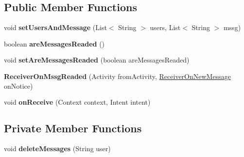 \subsection*{Public Member Functions}
\begin{DoxyCompactItemize}
\item 
void {\bfseries set\+Users\+And\+Message} (List$<$ String $>$ users, List$<$ String $>$ mssg)\hypertarget{classcom_1_1example_1_1sebastian_1_1tindertp_1_1services_1_1ReceiverOnMssgReaded_a0b295be6cc923886f566dd7314c4a232}{}\label{classcom_1_1example_1_1sebastian_1_1tindertp_1_1services_1_1ReceiverOnMssgReaded_a0b295be6cc923886f566dd7314c4a232}

\item 
boolean {\bfseries are\+Messages\+Readed} ()\hypertarget{classcom_1_1example_1_1sebastian_1_1tindertp_1_1services_1_1ReceiverOnMssgReaded_a9b267b3d5219a1ffc164fe71b8597c8e}{}\label{classcom_1_1example_1_1sebastian_1_1tindertp_1_1services_1_1ReceiverOnMssgReaded_a9b267b3d5219a1ffc164fe71b8597c8e}

\item 
void {\bfseries set\+Are\+Messages\+Readed} (boolean are\+Messages\+Readed)\hypertarget{classcom_1_1example_1_1sebastian_1_1tindertp_1_1services_1_1ReceiverOnMssgReaded_a408e241cdf6c2c7ec306cb8c66239d7a}{}\label{classcom_1_1example_1_1sebastian_1_1tindertp_1_1services_1_1ReceiverOnMssgReaded_a408e241cdf6c2c7ec306cb8c66239d7a}

\item 
{\bfseries Receiver\+On\+Mssg\+Readed} (Activity from\+Activity, \hyperlink{classcom_1_1example_1_1sebastian_1_1tindertp_1_1services_1_1ReceiverOnNewMessage}{Receiver\+On\+New\+Message} on\+Notice)\hypertarget{classcom_1_1example_1_1sebastian_1_1tindertp_1_1services_1_1ReceiverOnMssgReaded_a9edafadd0c17e71779d1cce4c87a8ceb}{}\label{classcom_1_1example_1_1sebastian_1_1tindertp_1_1services_1_1ReceiverOnMssgReaded_a9edafadd0c17e71779d1cce4c87a8ceb}

\item 
void {\bfseries on\+Receive} (Context context, Intent intent)\hypertarget{classcom_1_1example_1_1sebastian_1_1tindertp_1_1services_1_1ReceiverOnMssgReaded_a21fdef61bace4bbc1f3bd4c48f95ad98}{}\label{classcom_1_1example_1_1sebastian_1_1tindertp_1_1services_1_1ReceiverOnMssgReaded_a21fdef61bace4bbc1f3bd4c48f95ad98}

\end{DoxyCompactItemize}
\subsection*{Private Member Functions}
\begin{DoxyCompactItemize}
\item 
void {\bfseries delete\+Messages} (String user)\hypertarget{classcom_1_1example_1_1sebastian_1_1tindertp_1_1services_1_1ReceiverOnMssgReaded_a80dc64b0c8c8c5bb2eb6c18b27f07d94}{}\label{classcom_1_1example_1_1sebastian_1_1tindertp_1_1services_1_1ReceiverOnMssgReaded_a80dc64b0c8c8c5bb2eb6c18b27f07d94}

\end{DoxyCompactItemize}
